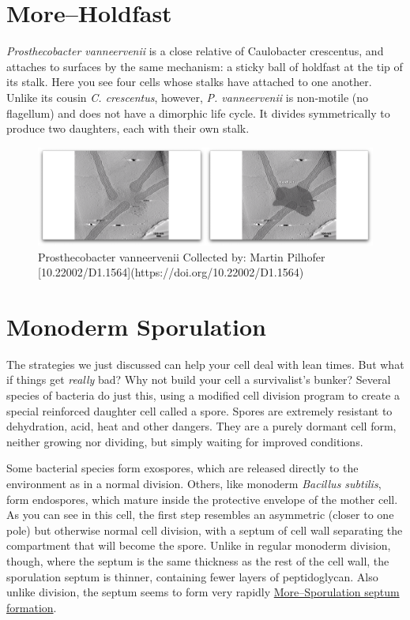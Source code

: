\documentclass[]{tufte-book}
\begin{document}
\hypertarget{moreholdfast}{\section{More--Holdfast}\label{moreholdfast}}

\emph{Prosthecobacter vanneervenii} is a close relative of Caulobacter
crescentus, and attaches to surfaces by the same mechanism: a sticky
ball of holdfast at the tip of its stalk. Here you see four cells whose
stalks have attached to one another. Unlike its cousin \emph{C.
crescentus}, however, \emph{P. vanneervenii} is non-motile (no
flagellum) and does not have a dimorphic life cycle. It divides
symmetrically to produce two daughters, each with their own stalk.

\begin{figure}
\includegraphics{movie_stills/8_4a} \caption[Prosthecobacter vanneervenii Collected by]{Prosthecobacter vanneervenii Collected by: Martin Pilhofer [10.22002/D1.1564](https://doi.org/10.22002/D1.1564)}\label{fig:unnamed-chunk-137}
\end{figure}

\section{Monoderm Sporulation}\label{monoderm-sporulation}

The strategies we just discussed can help your cell deal with lean
times. But what if things get \emph{really} bad? Why not build your cell
a survivalist's bunker? Several species of bacteria do just this, using
a modified cell division program to create a special reinforced daughter
cell called a spore. Spores are extremely resistant to dehydration,
acid, heat and other dangers. They are a purely dormant cell form,
neither growing nor dividing, but simply waiting for improved
conditions.

Some bacterial species form exospores, which are released directly to
the environment as in a normal division. Others, like monoderm
\emph{Bacillus subtilis}, form endospores, which mature inside the
protective envelope of the mother cell. As you can see in this cell, the
first step resembles an asymmetric (closer to one pole) but otherwise
normal cell division, with a septum of cell wall separating the
compartment that will become the spore. Unlike in regular monoderm
division, though, where the septum is the same thickness as the rest of
the cell wall, the sporulation septum is thinner, containing fewer
layers of peptidoglycan. Also unlike division, the septum seems to form
very rapidly
\protect\hyperlink{moresporulation-septum-formation}{More--Sporulation
septum formation}.
\end{document}
